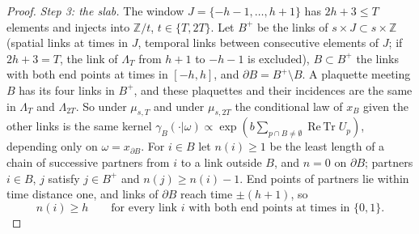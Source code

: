 \documentclass[11pt,a4paper]{amsart}
\theoremstyle{definition}
\theoremstyle{remark}
\numberwithin{equation}{section}
\DeclareMathOperator{\ReTr}{Re\,Tr}  %
\newcommand{\Z}{\mathbb{Z}}          %
\begin{document}
\begin{proof}
\emph{Step 3: the slab.} The window $J=\{-h-1,\dots,h+1\}$ has $2h+3\le T$ elements and injects into $\Z/t$, $t\in\{T,2T\}$. Let $B^+$ be the links of $s\times J\subset s\times\Z$ (spatial links at times in $J$, temporal links between consecutive elements of $J$; if $2h+3=T$, the link of $\Lambda_T$ from $h+1$ to $-h-1$ is excluded), $B\subset B^+$ the links with both end points at times in $[-h,h]$, and $\partial B=B^+\setminus B$. A plaquette meeting $B$ has its four links in $B^+$, and these plaquettes and their incidences are the same in $\Lambda_T$ and $\Lambda_{2T}$. So under $\mu_{s,T}$ and under $\mu_{s,2T}$ the conditional law of $x_B$ given the other links is the same kernel $\gamma_B(\cdot|\omega)\propto\exp(b\sum_{p\cap B\neq\emptyset}\ReTr U_p)$, depending only on $\omega=x_{\partial B}$. For $i\in B$ let $n(i)\ge1$ be the least length of a chain of successive partners from $i$ to a link outside $B$, and $n=0$ on $\partial B$; partners $i\in B$, $j$ satisfy $j\in B^+$ and $n(j)\ge n(i)-1$. End points of partners lie within time distance one, and links of $\partial B$ reach time $\pm(h+1)$, so
\begin{equation}\label{eq:ln-depth}
n(i)\ge h\qquad\text{for every link $i$ with both end points at times in $\{0,1\}$.}
\end{equation}


\end{proof}
\end{document}
